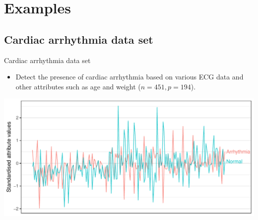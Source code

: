 \documentclass{beamer}\usepackage[]{graphicx}\usepackage[]{color}
\makeatletter
\def\maxwidth{ %
  \ifdim\Gin@nat@width>\linewidth
    \linewidth
  \else
    \Gin@nat@width
  \fi
}
\newenvironment{knitrout}{}{} %
\makeatother
\begin{document}
\ifstandalone
  \section{Examples}
\fi

\subsection{Cardiac arrhythmia data set}

\begin{frame}[fragile]{Cardiac arrhythmia data set}
\vspace{-20pt}
\begin{itemize}
\item Detect the presence of cardiac arrhythmia based on various ECG data and other attributes such as age and weight ($n = 451, p = 194$).
\end{itemize}

\begin{knitrout}\small
{}\color{fgcolor}

{\centering \includegraphics[width=\maxwidth]{figure/plot_cardiac-1} 

}



\end{knitrout}
\end{frame}
\end{document}
